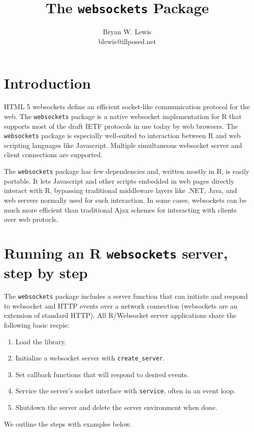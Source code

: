 \documentclass[12pt]{article}
\title{The {\tt websockets} Package}
\author{Bryan W. Lewis \\ 
blewis@illposed.net}
\begin{document}

\maketitle

\thispagestyle{empty}

\section{Introduction}

HTML 5 websockets define an efficient socket-like communication protocol for
the web. The {\tt websockets} package is a native websocket implementation for
R that supports most of the draft IETF protocols in use today by web browsers.
The {\tt websockets} package is especially well-suited to interaction between R
and web scripting languages like Javascript.  Multiple simultaneous websocket
server and client connections are supported.

The {\tt websockets} package has few  dependencies and, written mostly in R, is
easily portable.  It lets Javascript and other scripts embedded in web pages
directly interact with R, bypassing traditional middleware layers like .NET,
Java, and web servers normally used for such interaction. In some cases,
websockets can be much more efficient than traditional Ajax schemes for
interacting with clients over web protocls.

\section{Running an R {\tt websockets} server, step by step}

The {\tt websockets} package includes a server function that can initiate and
respond to websocket and HTTP events over a network connection
(websockets are an extension of standard HTTP).
All R/Websocket server applications share the following basic recpie:
\begin{enumerate}
\item Load the library.
\item Initialize a websocket server with {\tt create\_server}.
\item Set callback functions that will respond to desired events.
\item Service the server's socket interface with {\tt service}, often in an
      event loop.
\item Shutdown the server and delete the server environment when done.
\end{enumerate}
We outline the steps with examples below.
\end{document}
